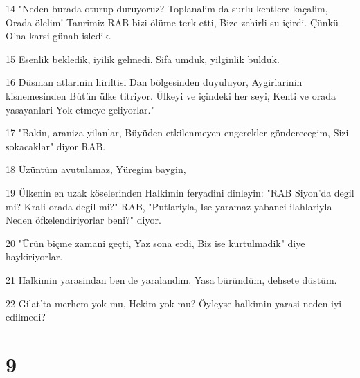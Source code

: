 \par 14 "Neden burada oturup duruyoruz? Toplanalim da surlu kentlere kaçalim, Orada ölelim! Tanrimiz RAB bizi ölüme terk etti, Bize zehirli su içirdi. Çünkü O'na karsi günah isledik.
\par 15 Esenlik bekledik, iyilik gelmedi. Sifa umduk, yilginlik bulduk.
\par 16 Düsman atlarinin hiriltisi Dan bölgesinden duyuluyor, Aygirlarinin kisnemesinden Bütün ülke titriyor. Ülkeyi ve içindeki her seyi, Kenti ve orada yasayanlari Yok etmeye geliyorlar."
\par 17 "Bakin, araniza yilanlar, Büyüden etkilenmeyen engerekler gönderecegim, Sizi sokacaklar" diyor RAB.
\par 18 Üzüntüm avutulamaz, Yüregim baygin,
\par 19 Ülkenin en uzak köselerinden Halkimin feryadini dinleyin: "RAB Siyon'da degil mi? Krali orada degil mi?" RAB, "Putlariyla, Ise yaramaz yabanci ilahlariyla Neden öfkelendiriyorlar beni?" diyor.
\par 20 "Ürün biçme zamani geçti, Yaz sona erdi, Biz ise kurtulmadik" diye haykiriyorlar.
\par 21 Halkimin yarasindan ben de yaralandim. Yasa büründüm, dehsete düstüm.
\par 22 Gilat'ta merhem yok mu, Hekim yok mu? Öyleyse halkimin yarasi neden iyi edilmedi?

\chapter{9}

